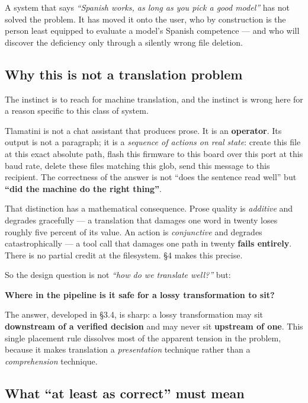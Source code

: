 A system that says \emph{``Spanish works, as long as you pick a good model''} has not solved the problem. It has moved it onto the user, who by construction is the person least equipped to evaluate a model's Spanish competence --- and who will discover the deficiency only through a silently wrong file deletion.

\subsection{Why this is not a translation problem}
\label{sec:why-this-is-not-a-translation-problem}

The instinct is to reach for machine translation, and the instinct is wrong here for a reason specific to this class of system.

Tlamatini is not a chat assistant that produces prose. It is an \textbf{operator}. Its output is not a paragraph; it is a \emph{sequence of actions on real state}: create this file at this exact absolute path, flash this firmware to this board over this port at this baud rate, delete these files matching this glob, send this message to this recipient. The correctness of the answer is not ``does the sentence read well'' but \textbf{``did the machine do the right thing''}.

That distinction has a mathematical consequence. Prose quality is \emph{additive} and degrades gracefully --- a translation that damages one word in twenty loses roughly five percent of its value. An action is \emph{conjunctive} and degrades catastrophically --- a tool call that damages one path in twenty \textbf{fails entirely}. There is no partial credit at the filesystem. \S4 makes this precise.

So the design question is not \emph{``how do we translate well?''} but:

\begin{keyinsight}
\textbf{Where in the pipeline is it safe for a lossy transformation to sit?}
\end{keyinsight}

The answer, developed in \S3.4, is sharp: a lossy transformation may sit \textbf{downstream of a verified decision} and may never sit \textbf{upstream of one}. This single placement rule dissolves most of the apparent tension in the problem, because it makes translation a \emph{presentation} technique rather than a \emph{comprehension} technique.

\subsection{What ``at least as correct'' must mean}
\label{sec:what-at-least-as-correct-must-mean}

